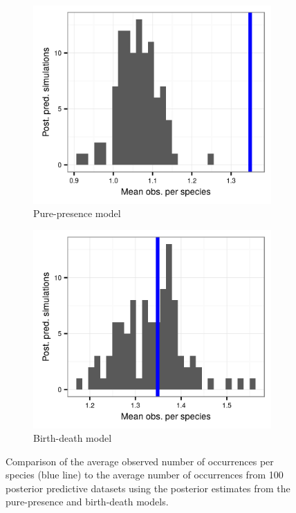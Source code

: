 \documentclass[12pt,letterpaper]{article}
\begin{document}
\begin{figure}[ht]
  \begin{subfigure}[b]{0.45\textwidth}
    \includegraphics[width=\textwidth,height=0.3\textheight,keepaspectratio=true]{figure/pred_occ}
    \caption{Pure-presence model}
    \label{fig:ppc_pure_presence}
  \end{subfigure}
  \begin{subfigure}[b]{0.45\textwidth}
    \includegraphics[width=\textwidth,height=0.3\textheight,keepaspectratio=true]{figure/pred_occ_bd}
    \caption{Birth-death model}
    \label{fig:ppc_birth_death}
  \end{subfigure}
  \caption[Posterior predictive check of average occurrence]{Comparison of the average observed number of occurrences per species (blue line) to the average number of occurrences from 100 posterior predictive datasets using the posterior estimates from the pure-presence and birth-death models.}
  \label{fig:ppc}
\end{figure}
\end{document}
